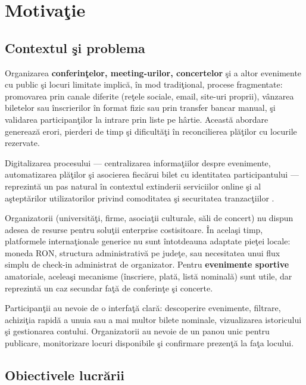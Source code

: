 \chapter{Motiva\c tie}
\sloppy


\section{Contextul \c si problema}

Organizarea \textbf{conferin\c telor, meeting-urilor, concertelor} \c si a altor evenimente cu public \c si locuri limitate implic\u a, \^in mod tradi\c tional, procese fragmentate: promovarea prin canale diferite (re\c tele sociale, email, site-uri proprii), v\^anzarea biletelor sau \^inscrierilor \^in format fizic sau prin transfer bancar manual, \c si validarea participan\c tilor la intrare prin liste pe h\^artie. Aceast\u a abordare genereaz\u a erori, pierderi de timp \c si dificult\u a\c ti \^in reconcilierea pl\u a\c tilor cu locurile rezervate.

Digitalizarea procesului — centralizarea informa\c tiilor despre evenimente, automatizarea pl\u a\c tilor \c si asocierea fiec\u arui bilet cu identitatea participantului — reprezint\u a un pas natural \^in contextul extinderii serviciilor online \c si al a\c stept\u arilor utilizatorilor privind comoditatea \c si securitatea tranzac\c tiilor \cite{fielding2000, stripe2024}.

Organizatorii (universit\u a\c ti, firme, asocia\c tii culturale, s\u ali de concert) nu dispun adesea de resurse pentru solu\c tii enterprise costisitoare. \^In acela\c si timp, platformele interna\c tionale generice nu sunt \^intotdeauna adaptate pie\c tei locale: moneda RON, structura administrativ\u a pe jude\c te, sau necesitatea unui flux simplu de check-in administrat de organizator. Pentru \textbf{evenimente sportive} amatoriale, acelea\c si mecanisme (\^inscriere, plat\u a, list\u a nominal\u a) sunt utile, dar reprezint\u a un caz secundar fa\c t\u a de conferin\c te \c si concerte.

Participan\c tii au nevoie de o interfa\c t\u a clar\u a: descoperire evenimente, filtrare, achizi\c tia rapid\u a a unuia sau  a mai multor bilete nominale, vizualizarea istoricului \c si gestionarea contului. Organizatorii au nevoie de un panou unic pentru publicare, monitorizare locuri disponibile \c si confirmare prezen\c t\u a la fa\c ta locului.




\section{Obiectivele lucr\u arii}

